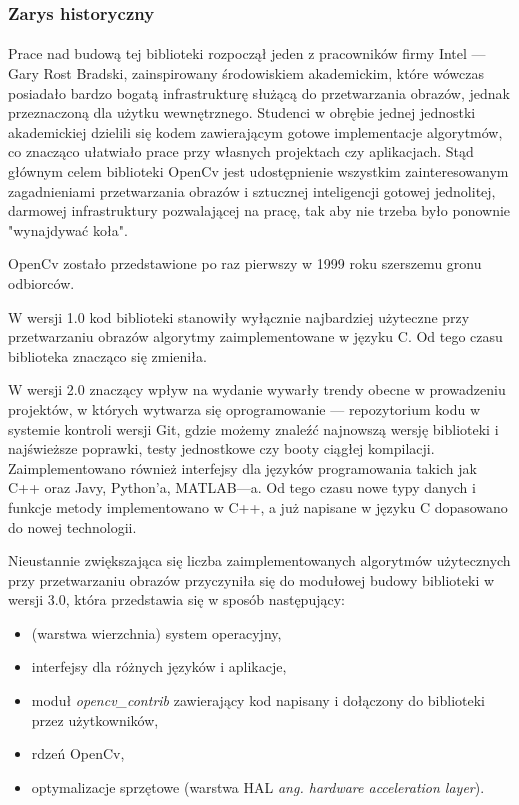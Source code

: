 \documentclass[a4paper,12pt]{article}
\begin{document}
		\subsubsection{Zarys historyczny}
			\paragraph{\indent} Prace nad budową tej biblioteki rozpoczął jeden z pracowników firmy Intel --- Gary Rost Bradski, 
				zainspirowany środowiskiem akademickim, które wówczas posiadało bardzo bogatą infrastrukturę służącą do przetwarzania obrazów, 
				jednak przeznaczoną dla użytku wewnętrznego. Studenci w obrębie jednej jednostki akademickiej dzielili się kodem zawierającym gotowe 
				implementacje algorytmów, co znacząco ułatwiało prace przy własnych projektach czy aplikacjach. Stąd głównym celem biblioteki OpenCv 
				jest udostępnienie wszystkim zainteresowanym zagadnieniami przetwarzania obrazów i sztucznej inteligencji gotowej jednolitej, 
				darmowej infrastruktury pozwalającej na pracę, tak aby nie trzeba było ponownie "wynajdywać koła".
			\par OpenCv zostało przedstawione po raz pierwszy w 1999 roku szerszemu gronu odbiorców. 
			\par W wersji 1.0 kod biblioteki stanowiły wyłącznie najbardziej użyteczne przy przetwarzaniu obrazów algorytmy zaimplementowane w języku C. 
				Od tego czasu biblioteka znacząco się zmieniła. 
			\par W wersji 2.0 znaczący wpływ na wydanie wywarły trendy obecne w prowadzeniu projektów, w których wytwarza się oprogramowanie --- repozytorium kodu
				w systemie kontroli wersji Git, gdzie możemy znaleźć najnowszą wersję biblioteki i najświeższe poprawki, testy jednostkowe czy booty ciągłej kompilacji. 
				Zaimplementowano również interfejsy dla języków programowania takich jak C++ oraz Javy, Python’a, MATLAB---a. Od tego czasu nowe typy danych 
				i funkcje metody implementowano w C++, a już napisane w języku C dopasowano do nowej technologii. 
			\par Nieustannie zwiększająca się liczba zaimplementowanych algorytmów użytecznych przy przetwarzaniu obrazów przyczyniła się do modułowej budowy 
				biblioteki w wersji 3.0, która przedstawia się w sposób następujący:
                
                \begin{spacing}{1}
    				\begin{itemize}
    					\item (warstwa wierzchnia) system operacyjny,
    					\item interfejsy dla różnych języków i aplikacje,
    					\item moduł \textit {opencv\_contrib} zawierający kod napisany i dołączony do biblioteki przez użytkowników,
    					\item rdzeń OpenCv,
    					\item optymalizacje sprzętowe (warstwa HAL \textit {ang. hardware acceleration layer}).
    				\end{itemize} 
                \end{spacing}
            
\end{document}
